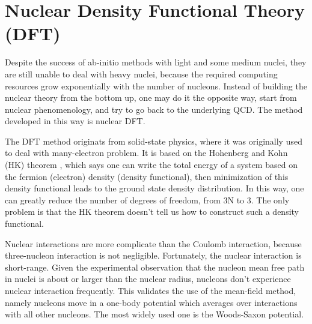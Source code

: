 \begin{comment}
Deviation of ab-initio result and observation for heavy nuclei indicates the 
importance of higher-order interactions.

\begin{equation}
    \CL_{eff} = \CL_{\pi\pi} + \CL_{\pi N} + \CL_{NN} + \cdots
\end{equation}

three-nucleon forces are hard to observe directly, they increase the pressure of
neutron matter and therefore the neutron skin thickness of both \Pb and \Ca.

three-nucleon force term
\begin{itemize}
    \item Long-range two-pion exchange
    \item Medium-range one-pion exchange
    \item Short range three-nucleon contact
\end{itemize}
\end{comment}
\section{Nuclear Density Functional Theory (DFT)}
Despite the success of ab-initio methods with light and some medium nuclei, 
they are still unable to deal with heavy nuclei, because the required computing resources 
grow exponentially with the number of nucleons.
Instead of building the nuclear theory from the bottom up, one may do it the opposite
way, start from nuclear phenomenology, and try to go back to the underlying
QCD. The method developed in this way is nuclear DFT.

The DFT method originats from solid-state physics, where it was originally used to deal with
many-electron problem. It is based on the Hohenberg and Kohn (HK) theorem \cite{PhysRevC.57.3430}, 
which says one can write the total energy of a system
based on the fermion (electron) density (density functional), 
then minimization of this density functional leads to the ground state 
density distribution. In this way, one can greatly reduce the number of degrees of freedom, 
from 3N to 3. The only problem is that the HK theorem 
doesn't tell us how to construct such a density functional.

Nuclear interactions are more complicate than the Coulomb interaction, 
because three-nucleon interaction is not negligible. Fortunately, the nuclear interaction
is short-range. Given the experimental observation that the nucleon mean
free path in nuclei is about or larger than the nuclear radius, 
nucleons don't experience nuclear interaction frequently. This validates the use
of the mean-field method, namely nucleons move in a one-body potential which averages 
over interactions with all other nucleons. The most widely used one is the Woods-Saxon
potential.

